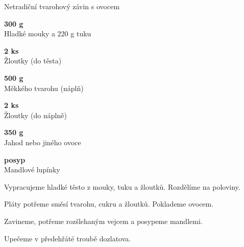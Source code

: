 \documentclass[11pt,a4paper]{article}
\begin{document}
\begin{recipe}[ForestGreen]{Netradiční tvarohový závin s ovocem}
    \begin{ingredients}
        \item \parbox[t]{\linewidth}{\raggedright \weight \textbf{300 g}\\ Hladké mouky a 220 g tuku}
        \item \parbox[t]{\linewidth}{\raggedright \piece \textbf{2 ks}\\ Žloutky (do těsta)}
        \item \parbox[t]{\linewidth}{\raggedright \piece \textbf{500 g}\\ Měkkého tvarohu (náplň)}
        \item \parbox[t]{\linewidth}{\raggedright \piece \textbf{2 ks}\\ Žloutky (do náplně)}
        \item \parbox[t]{\linewidth}{\raggedright \indefinite \textbf{350 g}\\ Jahod nebo jiného ovoce}
        \item \parbox[t]{\linewidth}{\raggedright \indefinite \textbf{posyp}\\ Mandlové lupínky}
    \end{ingredients}
    \begin{steps}
        \item Vypracujeme hladké těsto z mouky, tuku a žloutků. Rozdělíme na poloviny.
        \item Pláty potřeme směsí tvarohu, cukru a žloutků. Poklademe ovocem.
        \item Zavineme, potřeme rozšlehaným vejcem a posypeme mandlemi.
        \item Upečeme v předehřáté troubě dozlatova.
    \end{steps}
\end{recipe}
\end{document}
